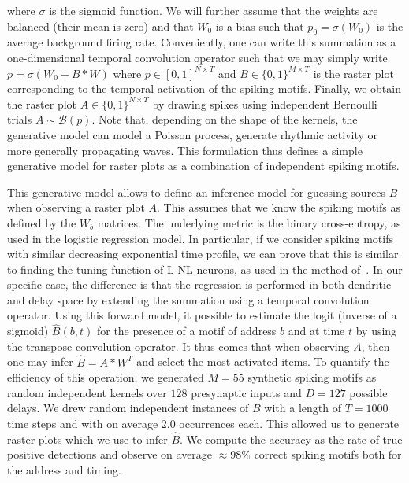 \documentclass[11pt]{article}
\begin{document}
where $\sigma$ is the sigmoid function. We will further assume that the weights are balanced (their mean is zero) and that $W_0$ is a bias such that $p_0=\sigma(W_0)$ is the average background firing rate. Conveniently, one can write this summation as a one-dimensional temporal convolution operator such that we may simply write $p = \sigma(W_0 + B \ast W )$ where  $p\in [ 0, 1]^{N\times T}$ and $B\in \{0, 1\}^{M\times T}$ is the raster plot corresponding to the temporal activation of the spiking motifs. Finally, we obtain the raster plot $A\in \{0, 1\}^{N\times T}$ by drawing spikes using independent Bernoulli trials $A \sim \mathcal{B}(p)$. Note that, depending on the shape of the kernels, the generative model can model a Poisson process, generate rhythmic activity or more generally propagating waves. This formulation thus defines a simple generative model for raster plots as a combination of independent spiking motifs. 

This generative model allows to define an inference model for guessing sources $B$ when observing a raster plot $A$. This assumes that we know the spiking motifs as defined by the $W_b$ matrices. The underlying metric is the binary cross-entropy, as used in the logistic regression model. In particular, if we consider spiking motifs with similar decreasing exponential time profile, we can prove that this is similar to finding the tuning function of L-NL neurons, as used in the method of~\parencite{berens_fast_2012}. In our specific case, the difference is that the regression is performed in both dendritic and delay space by extending the summation using a temporal convolution operator. Using this forward model, it possible to estimate the logit (inverse of a sigmoid) $\hat{B}(b, t)$ for the presence of a motif of address $b$ and at time $t$ by using the transpose convolution operator. It thus comes that when observing $A$, then one may infer $\hat{B} = A \ast W^T$ and select the most activated items. To quantify the efficiency of this operation, we generated $M=55$ synthetic spiking motifs as random independent kernels over $128$ presynaptic inputs and $D=127$ possible delays. We drew random independent instances of $B$ with a length of $T=1000$ time steps and with on average $2.0$ occurrences each. This allowed us to generate raster plots which we use to infer $\hat{B}$. We compute the accuracy as the rate of true positive detections and observe on average $\approx 98\%$ correct spiking motifs both for the address and %
timing.
\end{document}
